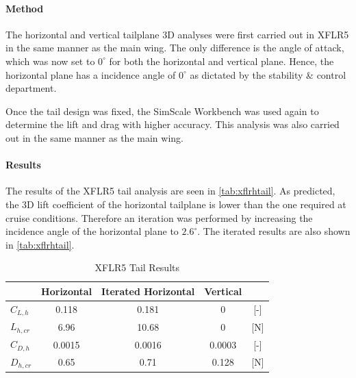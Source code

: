 \paragraph{Method} The horizontal and vertical tailplane 3D analyses were first carried out in XFLR5 in the same manner as the main wing. The only difference is the angle of attack, which was now set to $0^{\circ}$ for both the horizontal and vertical plane. Hence, the horizontal plane has a incidence angle of $0^{\circ}$ as dictated by the stability \& control department.

Once the tail design was fixed, the SimScale Workbench was used again to determine the lift and drag with higher accuracy. This analysis was also carried out in the same manner as the main wing.

\paragraph{Results} The results of the XFLR5 tail analysis are seen in \autoref{tab:xflrhtail}. As predicted, the 3D lift coefficient of the horizontal tailplane is lower than the one required at cruise conditions. Therefore an iteration was performed by increasing the incidence angle of the horizontal plane to $2.6^{\circ}$. The iterated results are also shown in \autoref{tab:xflrhtail}.

\begin{table}[H]
\centering
\caption{XFLR5 Tail Results}
\label{tab:xflrhtail}
\begin{tabular}{lcccc}
\toprule
 & \textbf{Horizontal} & \textbf{Iterated Horizontal} & \textbf{Vertical} & \\ \midrule
\textbf{$C_{L,h}$}   & 0.118 & 0.181 & 0 & {[}-{]} \\ \hdashline
\textbf{$L_{h,cr}$}    & 6.96 & 10.68 & 0 & {[}N{]} \\ \hdashline
\textbf{$C_{D,h}$}   & 0.0015 & 0.0016 & 0.0003 & {[}-{]} \\ \hdashline
\textbf{$D_{h,cr}$}    & 0.65 & 0.71 & 0.128 & {[}N{]} \\ \bottomrule
\end{tabular}
\end{table} 


